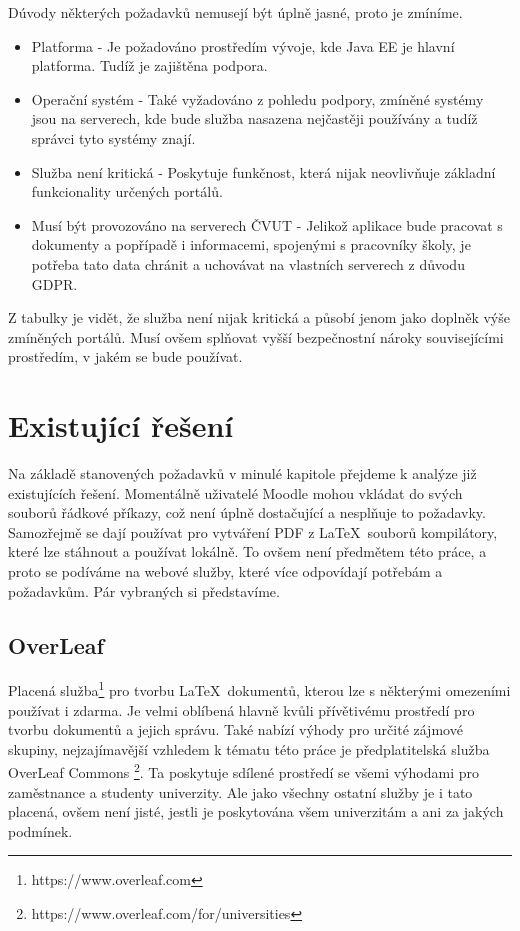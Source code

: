  Dúvody některých požadavků nemusejí být úplně jasné, proto je zmíníme.
 \begin{itemize}
 	\item Platforma - Je požadováno prostředím vývoje, kde Java EE je hlavní platforma. Tudíž je zajištěna podpora. 
 	\item Operační systém - Také vyžadováno z pohledu podpory, zmíněné systémy jsou na serverech, kde bude služba nasazena nejčastěji používány a tudíž správci tyto systémy znají.   
 	\item Služba není kritická - Poskytuje funkčnost, která nijak neovlivňuje základní funkcionality určených portálů. 
 	\item Musí být provozováno na serverech ČVUT - Jelikož aplikace bude pracovat s dokumenty a popřípadě i informacemi, spojenými s pracovníky školy, je potřeba tato data chránit a uchovávat na vlastních serverech z důvodu GDPR.
 \end{itemize}
 
 Z tabulky je vidět, že služba není nijak kritická a působí jenom jako doplněk výše zmíněných portálů. Musí ovšem splňovat vyšší bezpečnostní nároky souvisejícími prostředím, v jakém se bude používat. 

\section{Existující řešení}
Na základě stanovených požadavků v minulé kapitole přejdeme k analýze již existujících řešení. Momentálně uživatelé Moodle mohou vkládat do svých souborů řádkové příkazy, což není úplně dostačující a nesplňuje to požadavky. Samozřejmě se dají používat pro vytváření PDF z \LaTeX\ souborů kompilátory, které lze stáhnout a používat lokálně. To ovšem není předmětem této práce, a proto se podíváme na webové služby, které více odpovídají potřebám a požadavkům. Pár vybraných si představíme.  

\subsection{OverLeaf}
Placená služba\footnote{https://www.overleaf.com} pro tvorbu \LaTeX\ dokumentů, kterou lze s některými omezeními používat i zdarma. Je velmi oblíbená hlavně kvůli přívětivému prostředí pro tvorbu dokumentů a jejich správu. Také nabízí výhody pro určité zájmové skupiny, nejzajímavější vzhledem k tématu této práce je předplatitelská služba OverLeaf Commons \footnote{https://www.overleaf.com/for/universities}. Ta poskytuje sdílené prostředí se všemi výhodami pro zaměstnance a studenty univerzity. Ale jako všechny ostatní služby je i tato placená, ovšem není jisté, jestli je poskytována všem univerzitám a ani za jakých podmínek.

